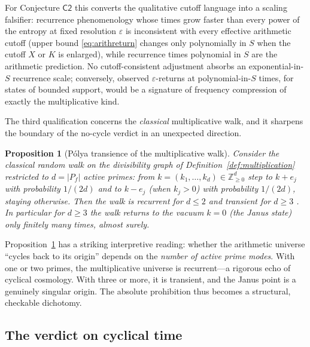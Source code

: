 \documentclass[11pt,a4paper]{article}
\theoremstyle{plain}
\newtheorem{proposition}[theorem]{Proposition}
\theoremstyle{definition}
\theoremstyle{remark}
\newcommand{\Zz}{\mathbb{Z}}
\begin{document}
For Conjecture $\mathsf{C2}$ this converts the qualitative cutoff language into a scaling
falsifier: recurrence phenomenology whose times grow faster than every power of the entropy
at fixed resolution $\varepsilon$ is inconsistent with every effective arithmetic cutoff
(upper bound \eqref{eq:arithreturn} changes only polynomially in $S$ when the cutoff $X$ or
$K$ is enlarged), while recurrence times polynomial in $S$ are the arithmetic prediction.
No cutoff-consistent adjustment absorbs an exponential-in-$S$ recurrence scale; conversely,
observed $\varepsilon$-returns at polynomial-in-$S$ times, for states of bounded support,
would be a signature of frequency compression of exactly the multiplicative kind.

The third qualification concerns the \emph{classical} multiplicative walk, and it sharpens
the boundary of the no-cycle verdict in an unexpected direction.

\begin{proposition}[P\'olya transience of the multiplicative walk]\label{prop:polya}
Consider the classical random walk on the divisibility graph of
Definition~\ref{def:multiplication} restricted to $d=|P_{f}|$ active primes: from
$k=(k_{1},\dots,k_{d})\in\Zz_{\geq0}^{d}$ step to $k+e_{j}$ with probability $1/(2d)$ and to
$k-e_{j}$ (when $k_{j}>0$) with probability $1/(2d)$, staying otherwise. Then the walk is
recurrent for $d\leq2$ and transient for $d\geq3$ \cite{polya1921}. In particular for
$d\geq3$ the walk returns to the vacuum $k=0$ (the Janus state) only finitely many times,
almost surely.
\end{proposition}

Proposition~\ref{prop:polya} has a striking interpretive reading: whether
the arithmetic universe ``cycles back to its origin'' depends on the \emph{number of active
prime modes}. With one or two primes, the multiplicative universe is recurrent---a rigorous
echo of cyclical cosmology. With three or more, it is transient, and the Janus point is a
genuinely singular origin. The absolute prohibition thus becomes a structural,
checkable dichotomy.

\subsection{The verdict on cyclical time}
\end{document}
